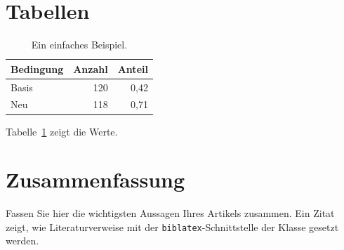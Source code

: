 \documentclass[ngerman]{dtk}
\begin{document}
\section{Tabellen}
\begin{table}[htbp]
  \caption{Ein einfaches Beispiel.}
  \label{tab:beispiel}
  \begin{tabular}{lrr}
    \toprule
    Bedingung & Anzahl & Anteil \\
    \midrule
    Basis     & 120    & 0{,}42 \\
    Neu       & 118    & 0{,}71 \\
    \bottomrule
  \end{tabular}
\end{table}

Tabelle~\ref{tab:beispiel} zeigt die Werte.

\section{Zusammenfassung}
Fassen Sie hier die wichtigsten Aussagen Ihres Artikels zusammen. Ein Zitat
\autocite{knuth1984texbook} zeigt, wie Literaturverweise mit der
\texttt{biblatex}-Schnittstelle der Klasse gesetzt werden.

\printbibliography
\end{document}
